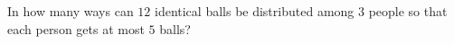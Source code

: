 In how many ways can $12$ identical balls be distributed among $3$ people so that each person gets at most $5$ balls?

